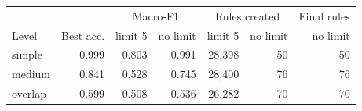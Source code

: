 \begin{tabular}{lrrrrrr}
\toprule
 & & \multicolumn{2}{c}{Macro-F1} & \multicolumn{2}{c}{Rules created} & Final rules \\
Level & Best acc. & limit 5 & no limit & limit 5 & no limit & no limit \\
\midrule
simple & 0.999 & 0.803 & 0.991 & 28,398 & 50 & 50 \\
medium & 0.841 & 0.528 & 0.745 & 28,400 & 76 & 76 \\
overlap & 0.599 & 0.508 & 0.536 & 26,282 & 70 & 70 \\
\bottomrule
\end{tabular}
